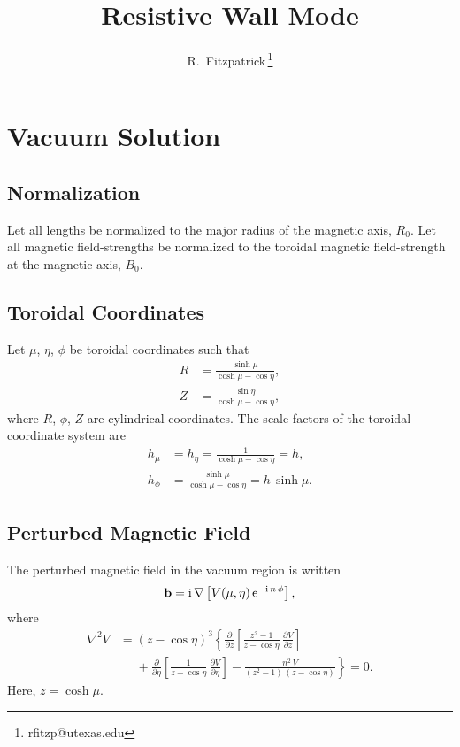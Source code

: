 \documentclass[12pt,prb,aps,notitlepage]{revtex4-1}
\begin{document}
\title{Resistive Wall Mode}
\author{R.~Fitzpatrick\,\footnote{rfitzp@utexas.edu}}
\begin{abstract}
\end{abstract}
\maketitle

\section{Vacuum Solution}

\subsection{Normalization}
Let all lengths be normalized to the major radius of the magnetic axis, $R_0$. Let all
magnetic field-strengths be normalized to the toroidal magnetic field-strength at the magnetic axis, $B_0$.

\subsection{Toroidal Coordinates}
Let $\mu$, $\eta$, $\phi$ be toroidal coordinates such that
\begin{align}
R &= \frac{\sinh\mu}{\cosh\mu-\cos\eta},\\[0.5ex]
Z&=\frac{\sin\eta}{\cosh\mu-\cos\eta},
\end{align}
where $R$, $\phi$, $Z$ are cylindrical coordinates. 
The scale-factors of the toroidal coordinate system are
\begin{align}
h_\mu&=h_\eta= \frac{1}{\cosh\mu-\cos\eta}=h,\\[0.5ex]
h_\phi &= \frac{\sinh\mu}{\cosh\mu-\cos\eta} = h\,\sinh\mu.
\end{align}

\subsection{Perturbed Magnetic Field}
The perturbed magnetic field in the vacuum region is written
\begin{equation}
{\bf b} = {\rm i}\,\nabla \left[V(\mu,\eta)\,{\rm e}^{-{\rm i}\,n\,\phi}\right],
\end{equation}
where
\begin{align}
\nabla^2 V &= (z-\cos\eta)^3\left\{\frac{\partial}{\partial z}\!\left[\frac{z^2-1}{z-\cos\eta}\,\frac{\partial V}{\partial z}\right]\right.\nonumber\\[0.5ex]
&\left.\phantom{=}+\frac{\partial}{\partial \eta}\!\left[\frac{1}{z-\cos\eta}\,\frac{\partial V}{\partial\eta}\right]
-\frac{n^2\,V}{(z^2-1)\,(z-\cos\eta)}\right\}=0.
\end{align}
Here, $z=\cosh\mu$. 
\end{document}
